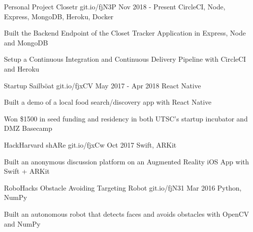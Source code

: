 \begin{cventries}
\cventry
    {Personal Project}
    {Closetr}
    {git.io/fjN3P}
    {Nov 2018 - Present}
    {CircleCI, Node, Express, MongoDB, Heroku, Docker}
    {
      \begin{cvitems}
        \item{Built the Backend Endpoint of the Closet Tracker Application in Express, Node and MongoDB}
        \item{Setup a Continuous Integration and Continuous Delivery Pipeline with CircleCI and Heroku}
      \end{cvitems}
    }
\cventry
  {Startup}
  {Sailböat}
  {git.io/fjxCV}
  {May 2017 - Apr 2018}
  {React Native}
  {
    \begin{cvitems}
      \item {Built a demo of a local food search/discovery app with React Native}
      \item {Won \$1500 in seed funding and residency in both UTSC's startup incubator and DMZ Basecamp}
    \end{cvitems}
  }
\cventry
  {HackHarvard}
  {shARe}
  {git.io/fjxCw}
  {Oct 2017}
  {Swift, ARKit}
  {
    \begin{cvitems}
      \item {Built an anonymous discussion platform on an Augmented Reality iOS App with Swift + ARKit}
    \end{cvitems}
  }
\cventry
  {RoboHacks}
  {Obstacle Avoiding Targeting Robot}
  {git.io/fjN31}
  {Mar 2016}
  {Python, NumPy}
  {
    \begin{cvitems}
      \item {Built an autonomous robot that detects faces and avoids obstacles with OpenCV and NumPy}
    \end{cvitems}
  }
\end{cventries}
